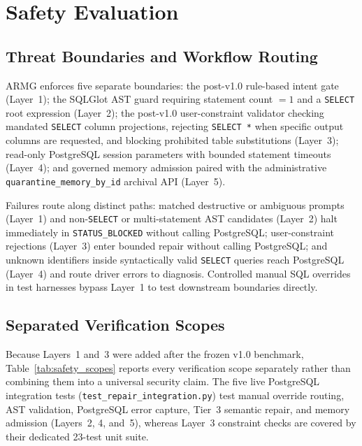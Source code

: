 \section{Safety Evaluation}
\label{sec:safety}
\subsection{Threat Boundaries and Workflow Routing}
ARMG enforces five separate boundaries: the post-v1.0 rule-based intent gate (Layer~1); the SQLGlot AST guard requiring statement count $= 1$ and a \texttt{SELECT} root expression (Layer~2); the post-v1.0 user-constraint validator checking mandated \texttt{SELECT} column projections, rejecting \texttt{SELECT *} when specific output columns are requested, and blocking prohibited table substitutions (Layer~3); read-only PostgreSQL session parameters with bounded statement timeouts (Layer~4); and governed memory admission paired with the administrative \texttt{quarantine\_\allowbreak{}memory\_\allowbreak{}by\_\allowbreak{}id} archival API (Layer~5).

Failures route along distinct paths: matched destructive or ambiguous prompts (Layer~1) and non-\texttt{SELECT} or multi-statement AST candidates (Layer~2) halt immediately in \texttt{STATUS\_\allowbreak{}BLOCKED} without calling PostgreSQL; user-constraint rejections (Layer~3) enter bounded repair without calling PostgreSQL; and unknown identifiers inside syntactically valid \texttt{SELECT} queries reach PostgreSQL (Layer~4) and route driver errors to diagnosis. Controlled manual SQL overrides in test harnesses bypass Layer~1 to test downstream boundaries directly.

\subsection{Separated Verification Scopes}
Because Layers~1 and~3 were added after the frozen v1.0 benchmark, Table~\ref{tab:safety_scopes} reports every verification scope separately rather than combining them into a universal security claim. The five live PostgreSQL integration tests (\texttt{test\_\allowbreak{}repair\_\allowbreak{}integration.py}) test manual override routing, AST validation, PostgreSQL error capture, Tier~3 semantic repair, and memory admission (Layers~2, 4, and~5), whereas Layer~3 constraint checks are covered by their dedicated 23-test unit suite.


